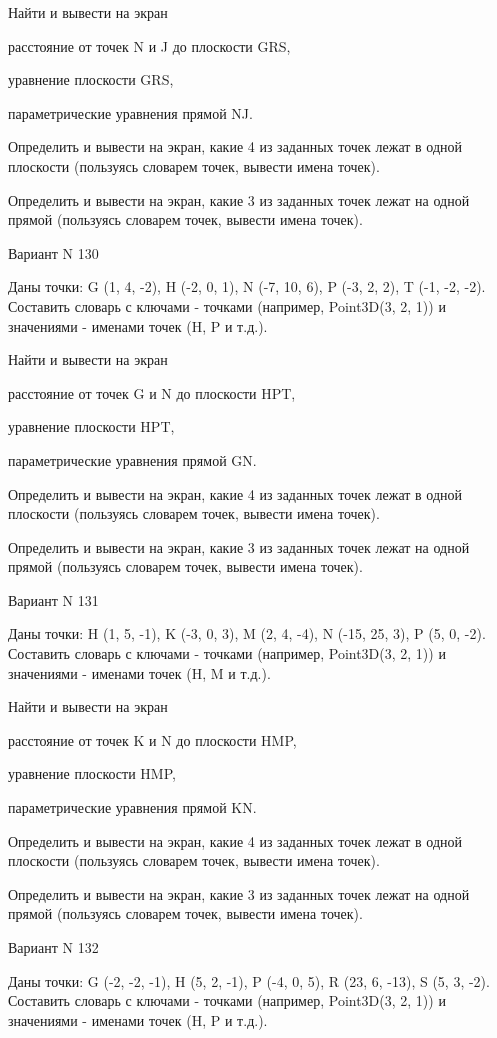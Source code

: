 \documentclass[11pt]{report}
\begin{document}
 
Найти и вывести на экран


расстояние от точек N и J до плоскости GRS,

 
уравнение плоскости GRS,

 
параметрические уравнения прямой NJ.


Определить и вывести на экран, какие 4 из заданных точек лежат в одной плоскости (пользуясь словарем точек, вывести имена точек).


Определить и вывести на экран, какие 3 из заданных точек лежат на одной прямой (пользуясь словарем точек, вывести имена точек).

Вариант N 130

Даны точки: G (1, 4, -2), H (-2, 0, 1), N (-7, 10, 6), P (-3, 2, 2), T (-1, -2, -2).
Составить словарь с ключами - точками (например, Point3D(3, 2, 1)) и значениями - именами точек (H, P и т.д.).

 
Найти и вывести на экран


расстояние от точек G и N до плоскости HPT,

 
уравнение плоскости HPT,

 
параметрические уравнения прямой GN.


Определить и вывести на экран, какие 4 из заданных точек лежат в одной плоскости (пользуясь словарем точек, вывести имена точек).


Определить и вывести на экран, какие 3 из заданных точек лежат на одной прямой (пользуясь словарем точек, вывести имена точек).

Вариант N 131

Даны точки: H (1, 5, -1), K (-3, 0, 3), M (2, 4, -4), N (-15, 25, 3), P (5, 0, -2).
Составить словарь с ключами - точками (например, Point3D(3, 2, 1)) и значениями - именами точек (H, M и т.д.).

 
Найти и вывести на экран


расстояние от точек K и N до плоскости HMP,

 
уравнение плоскости HMP,

 
параметрические уравнения прямой KN.


Определить и вывести на экран, какие 4 из заданных точек лежат в одной плоскости (пользуясь словарем точек, вывести имена точек).


Определить и вывести на экран, какие 3 из заданных точек лежат на одной прямой (пользуясь словарем точек, вывести имена точек).

Вариант N 132

Даны точки: G (-2, -2, -1), H (5, 2, -1), P (-4, 0, 5), R (23, 6, -13), S (5, 3, -2).
Составить словарь с ключами - точками (например, Point3D(3, 2, 1)) и значениями - именами точек (H, P и т.д.).
\end{document}
